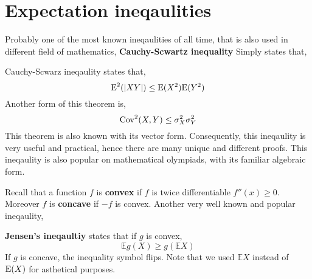 \section{Expectation ineqaulities}
Probably one of the most known ineqaulities of all time, that is also used in different field of mathematics, \textbf{Cauchy-Scwartz inequality} Simply states that,
\begin{theorem} Cauchy-Scwarz ineqaulity states that,
 \[ {\operatorname{E}}^2(|XY|) \le {\operatorname{E}}(X^2){\operatorname{E}}(Y^2) \]
 Another form of this theorem is,
 \[ \operatorname{Cov}^2(X,Y) \le \sigma^2_{X}\sigma^2_{Y} \]
This theorem is also known with its vector form. Consequently, this ineqaulity is very useful and practical, hence there are many unique and different proofs. \newline
This ineqaulity is also popular on mathematical olympiads, with its familiar algebraic form.
\end{theorem}
Recall that a function $f$ is \textbf{convex} if $f$ is twice differentiable $f''(x) \ge 0 $. Moreover $f$ is \textbf{concave} if $-f$ is convex. Another very well known and popular ineqaulity,
\begin{theorem} \textbf{Jensen's ineqaultiy} states that if $g$ is convex,
    \[ \mathbb{E}g(X) \ge g(\mathbb{E}X) \]
    If $g$ is concave, the inequality symbol flips. Note that we used $\mathbb{E}X$ instead of ${\operatorname{E}}(X)$ for asthetical purposes.
\end{theorem}

